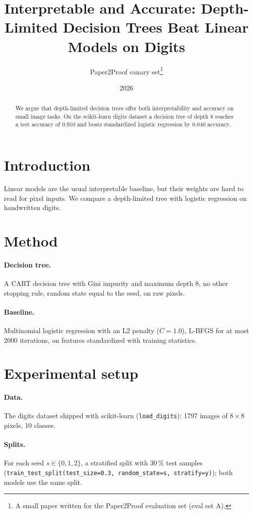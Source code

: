 \documentclass[11pt]{article}
\title{Interpretable and Accurate: Depth-Limited Decision Trees Beat Linear Models on Digits}
\author{Paper2Proof canary set\thanks{A small paper written for the Paper2Proof evaluation set (eval set A).}}
\date{2026}
\begin{document}
\maketitle

\begin{abstract}
We argue that depth-limited decision trees offer both interpretability and accuracy on small
image tasks. On the scikit-learn digits dataset a decision tree of depth 8 reaches a test
accuracy of 0.910 and beats standardized logistic regression by 0.040 accuracy.
\end{abstract}

\section{Introduction}
Linear models are the usual interpretable baseline, but their weights are hard to read for pixel
inputs. We compare a depth-limited tree with logistic regression on handwritten digits.

\section{Method}
\paragraph{Decision tree.} A CART decision tree with Gini impurity and maximum depth 8, no other
stopping rule, random state equal to the seed, on raw pixels.
\paragraph{Baseline.} Multinomial logistic regression with an L2 penalty ($C = 1.0$), L-BFGS for
at most 2000 iterations, on features standardized with training statistics.

\section{Experimental setup}
\paragraph{Data.} The digits dataset shipped with scikit-learn (\texttt{load\_digits}): 1797
images of $8 \times 8$ pixels, 10 classes.
\paragraph{Splits.} For each seed $s \in \{0, 1, 2\}$, a stratified split with 30\,\% test
samples (\texttt{train\_test\_split(test\_size=0.3, random\_state=s, stratify=y)}); both models
use the same split.
\end{document}
